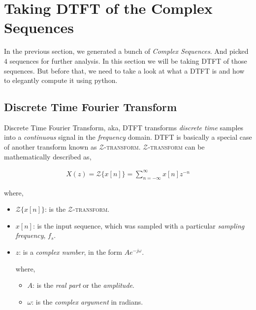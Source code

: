 \documentclass[../../course]{subfiles}
\begin{document}
\def\freqXOne{28}
\def\freqXTwo{56}
\def\freqXThree{56.1}

\def\sampFreqMuchLess{\textbf{(a):} $f_{s} = \frac{4 \times 28}{2} = 56 \si{Hz}$}
\def\sampFreqNorm{\textbf{(b):} $f_{s} = 4 \times 28 = 112 \si{Hz}$}
\def\sampFreqSligGreat{\textbf{(c):} $f_{s} = (4 \times 28) + 10 = 122 \si{Hz}$}
\def\sampFreqMuchGreat{\textbf{(d):} $f_{s} = 4 \times 28 \times 6 = 672 \si{Hz}$}

\section{Taking DTFT of the Complex Sequences} \label{sec:wrkTakingDTFTCplxSeqs}

In the previous section, we generated a bunch of \emph{Complex Sequences}. And
picked $4$ sequences for further analysis. In this section we will be taking
\textsc{DTFT} of those sequences. But before that, we need to take a look at what
a \textsc{DTFT} is and how to elegantly compute it using python.

\subsection{Discrete Time Fourier Transform}

Discrete Time Fourier Transform, aka, \textsc{DTFT} transforms \emph{discrete time}
samples into a \emph{continuous} signal in the \emph{frequency} domain. \textsc{DTFT}
is basically a special case of another transform known as $\mathcal{Z}$\textsc{-transform}.
$\mathcal{Z}$\textsc{-transform} can be mathematically described as,

\begin{align}
    X(z) = {\mathcal{Z}}\{x[n]\} = \sum_{n = - \infty}^{\infty} x[n] z^{-n}
\end{align}

where,

\begin{itemize} [label=]

    \item ${\mathcal{Z}}\{x[n]\}$: is the $\mathcal{Z}$\textsc{-transform}.
    \item $x[n]$: is the input sequence, which was sampled with a
        particular \emph{sampling frequency}, $f_{s}$.
    \item $z$: is a \emph{complex number}, in the form $A e^{-j \omega}$.

        where,

        \begin{itemize} [label=]
            \item $A$: is the \emph{real part} or the \emph{amplitude}.
            \item $\omega$: is the \emph{complex argument} in radians.
        \end{itemize}

\end{itemize}
\end{document}

